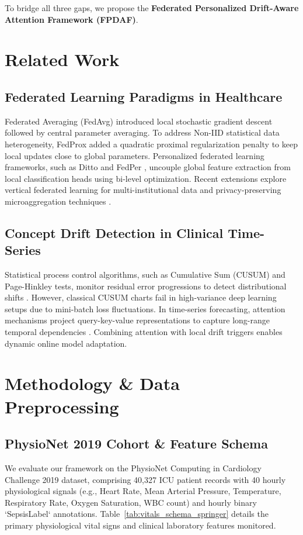 \documentclass[11pt,a4paper]{article}
\begin{document}
To bridge all three gaps, we propose the \textbf{Federated Personalized Drift-Aware Attention Framework (FPDAF)}.

\section{Related Work}
\subsection{Federated Learning Paradigms in Healthcare}
Federated Averaging (FedAvg) \cite{mcmahan2017} introduced local stochastic gradient descent followed by central parameter averaging. To address Non-IID statistical data heterogeneity, FedProx \cite{li2020fedprox} added a quadratic proximal regularization penalty to keep local updates close to global parameters. Personalized federated learning frameworks, such as Ditto \cite{li2021ditto} and FedPer \cite{arivazhagan2020}, uncouple global feature extraction from local classification heads using bi-level optimization. Recent extensions explore vertical federated learning for multi-institutional data \cite{yang2025mvfl} and privacy-preserving microaggregation techniques \cite{gupta2025privacy, maurya2025secure}.

\subsection{Concept Drift Detection in Clinical Time-Series}
Statistical process control algorithms, such as Cumulative Sum (CUSUM) and Page-Hinkley tests, monitor residual error progressions to detect distributional shifts \cite{jothimurugesan2022}. However, classical CUSUM charts fail in high-variance deep learning setups due to mini-batch loss fluctuations. In time-series forecasting, attention mechanisms project query-key-value representations to capture long-range temporal dependencies \cite{larocca2021attention, tang2025horizon}. Combining attention with local drift triggers enables dynamic online model adaptation.

\section{Methodology \& Data Preprocessing}
\subsection{PhysioNet 2019 Cohort \& Feature Schema}
We evaluate our framework on the PhysioNet Computing in Cardiology Challenge 2019 dataset, comprising 40,327 ICU patient records with 40 hourly physiological signals (e.g., Heart Rate, Mean Arterial Pressure, Temperature, Respiratory Rate, Oxygen Saturation, WBC count) and hourly binary `SepsisLabel` annotations. Table~\ref{tab:vitals_schema_springer} details the primary physiological vital signs and clinical laboratory features monitored.
\end{document}
